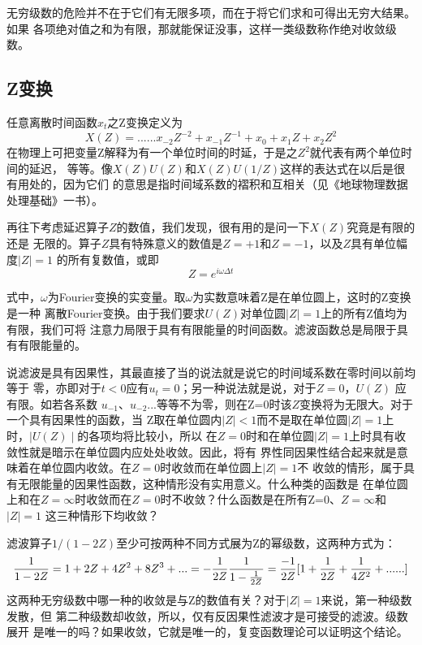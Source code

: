 无穷级数的危险并不在于它们有无限多项，而在于将它们求和可得出无穷大结果。如果
各项绝对值之和为有限，那就能保证没事，这样一类级数称作绝对收敛级数。

\subsection{Z变换}
\label{sec:4.6.2}


任意离散时间函数$x_t$之Z变换定义为
\begin{equation}
X(Z)=......x_{-2}Z^{-2}+x_{-1}Z^{-1}+x_0+x_1Z+x_2Z^2
\label{eq:ex4.6.1}
\end{equation}
在物理上可把变量Z解释为有一个单位时间的时延，于是之$Z^2$就代表有两个单位时间的延迟，
等等。像$X(Z)U(Z)$和$X(Z)U(1/Z)$这样的表达式在以后是很有用处的，因为它们
的意思是指时间域系数的褶积和互相关（见《地球物理数据处理基础》一书）。

再往下考虑延迟算子$Z$的数值，我们发现，很有用的是问一下$X(Z)$究竟是有限的还是
无限的。算子$Z$具有特殊意义的数值是$Z=+1$和$Z=-1$，以及$Z$具有单位幅度$\mid Z\mid =1$
的所有复数值，或即
\begin{equation}
Z=e^{i\omega \Delta t}
\label{eq:ex4.6.2}
\end{equation}

式中，$\omega$为Fourier变换的实变量。取$\omega$为实数意味着Z是在单位圆上，这时的Z变换是一种
离散Fourier变换。由于我们要求$U(Z)$对单位圆$\mid Z\mid=1$上的所有Z值均为有限，我们可将
注意力局限于具有有限能量的时间函数。滤波函数总是局限于具有有限能量的。

说滤波是具有因果性，其最直接了当的说法就是说它的时间域系数在零时间以前均等于
零，亦即对于$t<0$应有$u_t=0$；另一种说法就是说，对于$Z=0$，$U(Z)$
应有限。如若各系数
$u_{-1}$、$u_{-2}$...等等不为零，则在Z=0时该$Z$变换将为无限大。对于一个具有因果性的函数，当
Z取在单位圆内$\mid Z\mid<1$而不是取在单位圆$\mid Z\mid=1$上时，$\mid U(Z)\mid$的各项均将比较小，所以
在$Z=0$时和在单位圆$\mid Z\mid=1$上时具有收敛性就是暗示在单位圆内应处处收敛。因此，将有
界性同因果性结合起来就是意味着在单位圆内收敛。在$Z=0$时收敛而在单位圆上$\mid Z\mid=1$不
收敛的情形，属于具有无限能量的因果性函数，这种情形没有实用意义。什么种类的函数是
在单位圆上和在$Z=\infty$时收敛而在$Z=0$时不收敛？什么函数是在所有Z=0、$Z=\infty$和$\mid Z\mid=1$
这三种情形下均收敛？

滤波算子$1/(1-2Z)$至少可按两种不同方式展为Z的幂级数，这两种方式为：
\begin{equation}
\frac{1}{1-2Z}=1+2Z+4Z^2+8Z^3+...\\
=-\frac{1}{2Z}\frac{1}{1-\frac{1}{2Z}}=\frac{-1}{2Z}[1+\frac{1}{2Z}+\frac{1}{4Z^2}+......]
\label{eq:4.6.3}
\end{equation}
这两种无穷级数中哪一种的收敛是与Z的数值有关？对于$\mid Z\mid=1$来说，第一种级数发散，但
第二种级数却收敛，所以，仅有反因果性滤波才是可接受的滤波。级数展开
是唯一的吗？如果收敛，它就是唯一的，复变函数理论可以证明这个结论。

